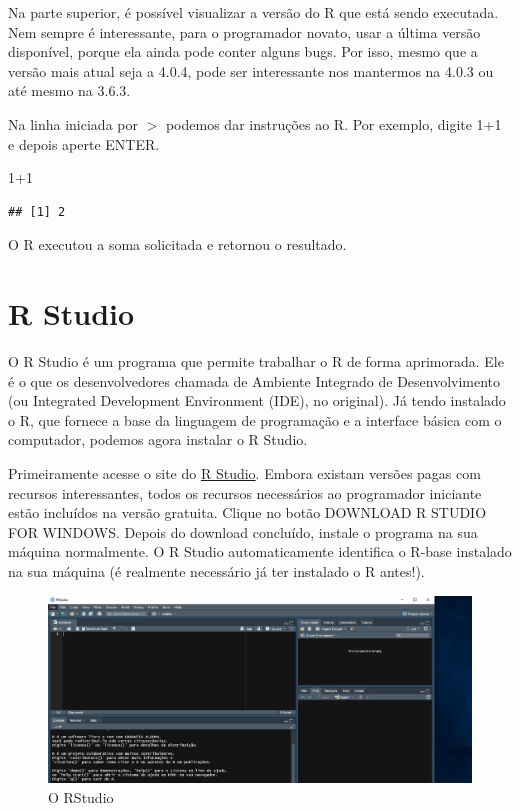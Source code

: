 \documentclass[
]{book}
\newenvironment{Shaded}{\begin{snugshade}}{\end{snugshade}}
\newcommand{\DecValTok}[1]{\textcolor[rgb]{0.00,0.00,0.81}{#1}}
\newcommand{\SpecialCharTok}[1]{\textcolor[rgb]{0.00,0.00,0.00}{#1}}
\begin{document}
Na parte superior, é possível visualizar a versão do R que está sendo executada. Nem sempre é interessante, para o programador novato, usar a última versão disponível, porque ela ainda pode conter alguns bugs. Por isso, mesmo que a versão mais atual seja a 4.0.4, pode ser interessante nos mantermos na 4.0.3 ou até mesmo na 3.6.3.

Na linha iniciada por \(>\) podemos dar instruções ao R. Por exemplo, digite 1+1 e depois aperte ENTER.

\begin{Shaded}
\begin{Highlighting}[]
\DecValTok{1}\SpecialCharTok{+}\DecValTok{1}
\end{Highlighting}
\end{Shaded}

\begin{verbatim}
## [1] 2
\end{verbatim}

O R executou a soma solicitada e retornou o resultado.

\hypertarget{r-studio}{%
\section{R Studio}\label{r-studio}}

O R Studio é um programa que permite trabalhar o R de forma aprimorada. Ele é o que os desenvolvedores chamada de Ambiente Integrado de Desenvolvimento (ou Integrated Development Environment (IDE), no original). Já tendo instalado o R, que fornece a base da linguagem de programação e a interface básica com o computador, podemos agora instalar o R Studio.

Primeiramente acesse o site do \href{https://www.rstudio.com/products/rstudio/download/\#download}{R Studio}. Embora existam versões pagas com recursos interessantes, todos os recursos necessários ao programador iniciante estão incluídos na versão gratuita. Clique no botão DOWNLOAD R STUDIO FOR WINDOWS. Depois do download concluído, instale o programa na sua máquina normalmente. O R Studio automaticamente identifica o R-base instalado na sua máquina (é realmente necessário já ter instalado o R antes!).

\begin{figure}
\centering
\includegraphics{r-studio-all.PNG}
\caption{O RStudio}
\end{figure}
\end{document}

